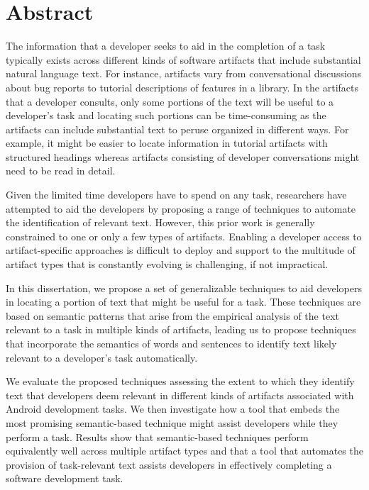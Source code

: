 

\chapter*{Abstract}

The information that a developer seeks to aid in the completion of a task typically exists across different kinds of software artifacts that include substantial natural language text. For instance,
artifacts vary from conversational discussions about bug reports to tutorial descriptions of features in a library.
In the artifacts that a developer consults, only some portions of the text will be useful to a developer's task
and locating such portions can be time-consuming as the artifacts can include substantial text to peruse organized in different ways. For example, it might be easier to locate information
in tutorial artifacts with structured headings whereas artifacts consisting of developer conversations might need to be read in detail. 


Given the limited time developers have to spend on any task, researchers have 
attempted to aid the developers by proposing a range of techniques to automate the identification of relevant text. 
However, this prior work is generally constrained to one or only a few types of artifacts.  
Enabling a developer access to artifact-specific approaches is difficult to deploy
and support to the multitude of artifact types that is constantly evolving
is challenging, if not impractical.

In this dissertation, we propose a set of generalizable techniques to aid developers in locating a portion of text that might be useful for a task. These techniques are based on semantic patterns that arise from the empirical analysis of the text relevant to a task in multiple kinds of artifacts, leading us to propose techniques that incorporate the semantics of words and sentences to identify text likely relevant to a developer's task automatically.

We evaluate the proposed techniques assessing the extent to which they identify text that developers deem relevant in different kinds of artifacts associated with Android development tasks. We then investigate how a tool that embeds the most promising semantic-based technique might assist developers while they perform a task. Results show that semantic-based techniques perform equivalently well across multiple artifact types and that a tool that automates the provision of task-relevant text assists developers in effectively completing a software development task.
    

